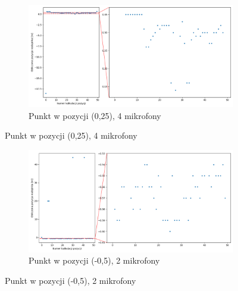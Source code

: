 \begin{figure}[H]
    \ContinuedFloat\centering
    \begin{subfigure}{\textwidth}
        \centering
        \includegraphics[width=\linewidth]{pics/mult_lat_1d/position_[0.25]_4.png}
        \caption{Punkt w pozycji  (0,25), 4 mikrofony}
        \label{pic:1d_mult_[0.25]_4}
    \end{subfigure}
\end{figure}
\begin{figure}[H]
    \ContinuedFloat\centering
    \begin{subfigure}{\textwidth}
        \centering
        \includegraphics[width=\linewidth]{pics/mult_lat_1d/position_[-0.5]_2.png}
        \caption{Punkt w pozycji  (-0,5), 2 mikrofony}
        \label{pic:1d_mult_[-0.5]_2}
    \end{subfigure}
\end{figure}
